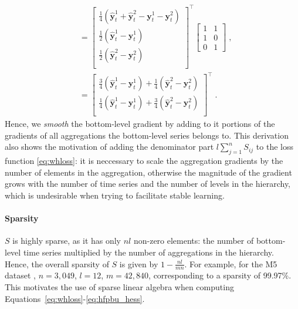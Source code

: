 \documentclass[preprint, 3p, times, twocolumn]{elsarticle}
\begin{document}
\begin{align}
  &=          
   \begin{bmatrix}
     \frac{1}{4}(\hat{\textbf{y}}^1_{t} + \hat{\textbf{y}}^2_{t} - \textbf{y}^1_{t} - \textbf{y}^2_{t}) \\
     \frac{1}{2}(\hat{\textbf{y}}^1_{t} - \textbf{y}^1_{t}) \\
     \frac{1}{2}(\hat{\textbf{y}}^2_{t} - \textbf{y}^2_{t}) \\
   \end{bmatrix}^\intercal
   \begin{bmatrix}
     1 &1 \\
     1 &0 \\
     0 &1
   \end{bmatrix}  \;, \nonumber \\
  &=
  \begin{bmatrix}
    \frac{3}{4}(\hat{\textbf{y}}^1_{t} - \textbf{y}^1_{t}) + \frac{1}{4}(\hat{\textbf{y}}^2_{t} - \textbf{y}^2_{t}) \\
    \frac{1}{4}(\hat{\textbf{y}}^1_{t} - \textbf{y}^1_{t}) + \frac{3}{4}(\hat{\textbf{y}}^2_{t} - \textbf{y}^2_{t}) \\
  \end{bmatrix}^\intercal  \; \nonumber.      
\end{align}  
Hence, we \textit{smooth} the bottom-level gradient by adding to it portions of the gradients of all aggregations the bottom-level series belongs to. This derivation also shows the motivation of adding the denominator part \(l \sum_{j=1}^n S_{ij} \) to the loss function \eqref{eq:whloss}: it is neccessary to scale the aggregation gradients by the number of elements in the aggregation, otherwise the magnitude of the gradient grows with the number of time series and the number of levels in the hierarchy, which is undesirable when trying to facilitate stable learning.
  
\paragraph{Sparsity} \(S\) is highly sparse, as it has only \(nl\) non-zero elements: the number of bottom-level time series multiplied by the number of aggregations in the hierarchy. Hence, the overall sparsity of \(S\) is given by \( 1 - \frac{nl}{mn} \). For example, for the M5 dataset \cite{makridakis_m5_2021}, \(n = 3,049\), \(l = 12\), \(m=42,840\), corresponding to a sparsity of 99.97\%. This motivates the use of sparse linear algebra when computing Equations~\eqref{eq:whloss}-\eqref{eq:hfpbu_hess}.
\end{document}
